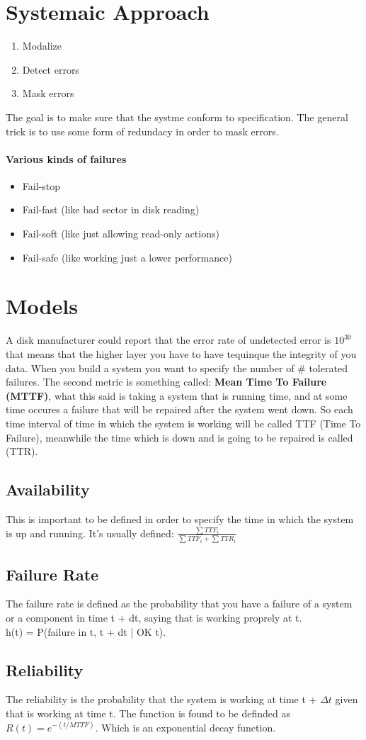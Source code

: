 \documentclass{article}
\begin{document}
  \section{Systemaic Approach}
    \begin{enumerate}
      \item Modalize 
      \item Detect errors 
      \item Mask errors 
    \end{enumerate}
    The goal is to make sure that the systme conform to specification.
    The general trick is to use some form of redundacy in order to mask errors.
    \paragraph{Various kinds of failures}
      \begin{itemize}
        \item Fail-stop  
        \item Fail-fast (like bad sector in disk reading) 
        \item Fail-soft (like just allowing read-only actions) 
        \item Fail-safe (like working just a lower performance) 
      \end{itemize}
  \section{Models}
    A disk manufacturer could report that the error rate of undetected error is $10^{30}$ that
    means that the higher layer you have to have tequinque the integrity of you data.
    When you build a system you want to specify the number of \# tolerated failures. The second
    metric is something called: \textbf{Mean Time To Failure (MTTF)}, what this said is 
    taking a system that is running time, and at some time occures a failure that will be 
    repaired after the system went down. So each time interval of time in which the system
    is working will be called TTF (Time To Failure), meanwhile the time which is down 
    and is going to be repaired is called (TTR).
    \subsection{Availability}
      This is important to be defined in order to specify the time in which the system is up
      and running. It's usually defined: $\frac{\sum{TTF_i}} {\sum{TTF_i} + \sum{TTR_i}}$
    \subsection{Failure Rate}
      The failure rate is defined as the probability that you have a failure of a system or
      a component in time t + dt, saying that is working proprely at t. \\ h(t) = P(failure in t,
      t + dt | OK \@ t).
    \subsection{Reliability}
      The reliability is the probability that the system is working at time t + $\Delta t$ given that 
      is working at time t. The function is found to be definded as $R(t) = e^{-(t/MTTF)}$. Which
      is an exponential decay function.
\end{document}
